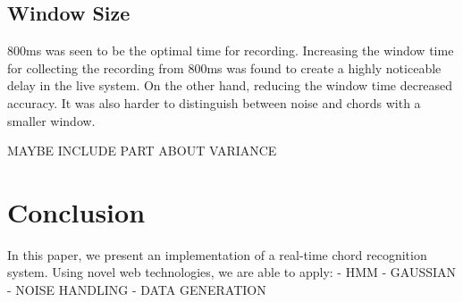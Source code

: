 \documentclass{article}
\begin{document}
\subsection{Window Size}
800ms was seen to be the optimal time for recording. Increasing the window time for collecting the recording from 800ms was found to create a highly noticeable delay in the live system. On the other hand, reducing the window time decreased accuracy. It was also harder to distinguish between noise and chords with a smaller window.

MAYBE INCLUDE PART ABOUT VARIANCE

\section{Conclusion}
In this paper, we present an implementation of a real-time chord recognition system. Using novel web technologies, we are able to apply:
- HMM
- GAUSSIAN
- NOISE HANDLING
- DATA GENERATION



\end{document}
